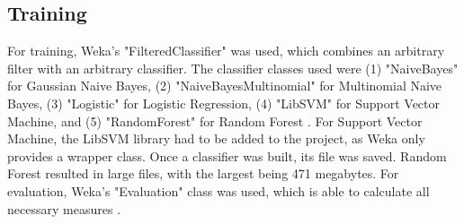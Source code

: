 \subsection{Training}
For training, Weka's "FilteredClassifier" was used, which combines an arbitrary filter with an arbitrary classifier. The classifier classes used were (1) "NaiveBayes" for Gaussian Naive Bayes, (2) "NaiveBayesMultinomial" for Multinomial Naive Bayes, (3) "Logistic" for Logistic Regression, (4) "LibSVM" for Support Vector Machine, and (5) "RandomForest" for Random Forest \cite{Weka}. For Support Vector Machine, the LibSVM library \cite{Chang2001} had to be added to the project, as Weka only provides a wrapper class. Once a classifier was built, its file was saved. Random Forest resulted in large files, with the largest being 471 megabytes. For evaluation, Weka's "Evaluation" class was used, which is able to calculate all necessary measures \cite{Weka}.